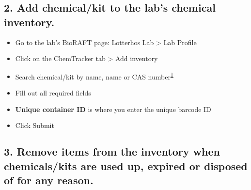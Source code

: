 \documentclass[
  letterpaper,
  DIV=11,
  numbers=noendperiod]{scrreprt}
\begin{document}
\hypertarget{add-chemicalkit-to-the-labs-chemical-inventory.}{%
\subsection*{\texorpdfstring{\textbf{2. Add chemical/kit to the lab's
chemical
inventory.}}{2. Add chemical/kit to the lab's chemical inventory.}}\label{add-chemicalkit-to-the-labs-chemical-inventory.}}

\begin{itemize}
\item
  Go to the lab's BioRAFT page: Lotterhos Lab \textgreater{} Lab Profile
\item
  Click on the ChemTracker tab \textgreater{} Add inventory
\item
  Search chemical/kit by name, name or CAS
  number\textsuperscript{\href{https://drk-lo.github.io/lotterhoslabprotocols/general_chemical_inventory/\#fn:1}{1}}
\item
  Fill out all required fields
\item
  \textbf{Unique container ID} is where you enter the unique barcode ID
\item
  Click Submit
\end{itemize}

\hypertarget{remove-items-from-the-inventory-when-chemicalskits-are-used-up-expired-or-disposed-of-for-any-reason.}{%
\subsection*{\texorpdfstring{\textbf{3. Remove items from the inventory
when chemicals/kits are used up, expired or disposed of for any
reason.}}{3. Remove items from the inventory when chemicals/kits are used up, expired or disposed of for any reason.}}\label{remove-items-from-the-inventory-when-chemicalskits-are-used-up-expired-or-disposed-of-for-any-reason.}}
\end{document}
